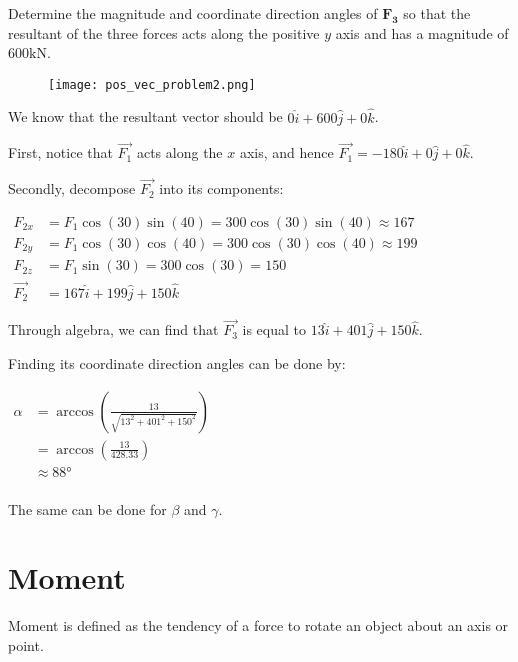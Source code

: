 \documentclass{scrartcl}
\begin{document}
Determine the magnitude and coordinate direction angles of \(\mathbf{F_3}\) so that the resultant of the three forces acts
along the positive \(y\) axis and has a magnitude of \(600\unit{\kilo\newton}\).

\begin{figure}[h]
    \centering
    \texttt{[image: pos\_vec\_problem2.png]}
\end{figure}

We know that the resultant vector should be \(0\hat{i} + 600\hat{j} + 0\hat{k}\).

First, notice that \(\vec{F_1}\) acts along the \(x\) axis, and hence \(\vec{F_1} = -180\hat{i} + 0\hat{j} + 0\hat{k}\).

Secondly, decompose \(\vec{F_2}\) into its components:

\begin{math}
    \begin{aligned}
        F_{2x} &= F_1 \cos(30) \sin(40) = 300 \cos(30) \sin(40) \approx 167 \\
        F_{2y} &= F_1 \cos(30) \cos(40) = 300 \cos(30) \cos(40) \approx 199 \\
        F_{2z} &= F_1 \sin(30) = 300 \cos(30) = 150 \\
        \vec{F_2} &= 167\hat{i} + 199\hat{j} + 150\hat{k}
    \end{aligned}
\end{math}

Through algebra, we can find that \(\vec{F_3}\) is equal to \(13\hat{i} + 401\hat{j} + 150\hat{k}\).

Finding its coordinate direction angles can be done by:

\begin{math}
    \begin{aligned}
        \alpha &= \arccos(\frac{13}{\sqrt{13^2 + 401^2 + 150^2}}) \\
        &= \arccos(\frac{13}{428.33}) \\
        &\approx 88\si{\degree} \\
    \end{aligned}
\end{math}

The same can be done for \(\beta\) and \(\gamma\).

\section{Moment}

Moment is defined as the tendency of a force to rotate an object 
about an axis or point.
\end{document}
